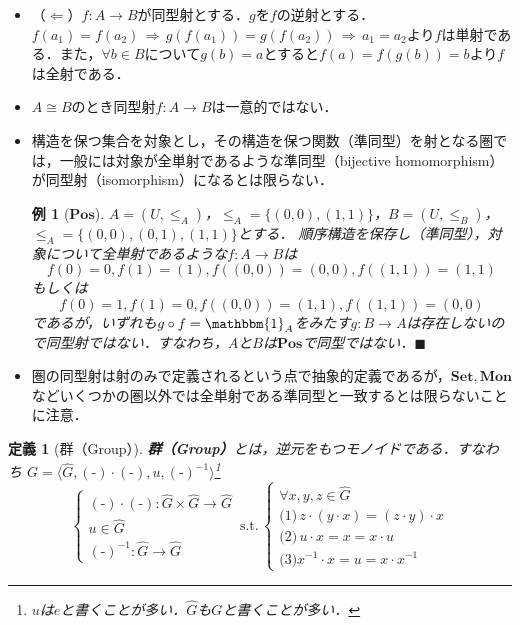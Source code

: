 \documentclass[dvipdfmx,a4j,10pt]{jsarticle}
\makeatletter
\theoremstyle{mystyle1}
\theoremstyle{mystyle2}
\newtheorem{dfn*}{定義}
\newtheorem{example}{例}
\renewenvironment{proof}[1][\proofname]{\par
  \pushQED{\qed}%
  \normalfont
  \topsep6\p@\@plus6\p@ \trivlist
  \item[\hskip\labelsep{\bfseries\sffamily #1}]\ignorespaces
}{%
  \popQED\endtrivlist\@endpefalse
}
\renewcommand\proofname{証明}
\newcommand{\Mon}{\mathbf{Mon}}
\makeatother
\begin{document}
\begin{itemize}
\begin{proof}
		      （$\Leftarrow$）$f:A\to B$が同型射とする．$g$を$f$の逆射とする．$f(a_1)=f(a_2)\,\Rightarrow\, g(f(a_1))=g(f(a_2))\,\Rightarrow\, a_1=a_2$より$f$は単射である．また，$\forall b\in B$について$g(b)=a$とすると$f(a)=f(g(b))=b$より$f$は全射である．
	      \end{proof}
	\item $A\cong B$のとき同型射$f:A\to B$は一意的ではない．
	\item 構造を保つ集合を対象とし，その構造を保つ関数（準同型）を射となる圏では，一般には対象が全単射であるような準同型（bijective homomorphism）が同型射（isomorphism）になるとは限らない．
	      \begin{example}[$\mathbf{Pos}$]
		      $A=(U,\leq_A)$，$\leq_A=\{(0,0),(1,1)\}$，$B=(U,\leq_B)$，$\leq_A=\{(0,0),(0,1),(1,1)\}$とする．
		      順序構造を保存し（準同型），対象について全単射であるような$f:A\to B$は
		      \[
			      f(0)=0,f(1)=(1),f((0,0))=(0,0),f((1,1))=(1,1)
		      \]
		      もしくは
		      \[
			      f(0)=1,f(1)=0,f((0,0))=(1,1),f((1,1))=(0,0)
		      \]
		      であるが，いずれも$g\circ f=\mathbbm{1}_A$をみたす$g:B\to A$は存在しないので同型射ではない．すなわち，$A$と$B$は$\mathbf{Pos}$で同型ではない．$\blacksquare$
	      \end{example}
	\item 圏の同型射は射のみで定義されるという点で抽象的定義であるが，$\mathbf{Set},\Mon$などいくつかの圏以外では全単射である準同型と一致するとは限らないことに注意．
\end{itemize}

\begin{dfn*}[群（Group）]
	\textbf{群（Group）}とは，逆元をもつモノイドである．すなわち
	$G=\langle \hat{G},(\textrm{-})\cdot (\textrm{-}),u,(\textrm{-})^{-1} \rangle$\footnote{$u$は$e$と書くことが多い．$\hat G$も$G$と書くことが多い．}\\
	\[
		\begin{cases}
			(\textrm{-})\cdot(\textrm{-}):\hat{G}\times\hat{G}\to\hat{G} \\
			u\in\hat{G}                                                  \\
			(\textrm{-})^{-1}:\hat{G}\to\hat{G}
		\end{cases}\,\textrm{s.t.}\,
		\begin{cases}
			\forall x,y,z\in\hat{G}                          \\
			\textrm{(1)}\,z\cdot(y\cdot x)=(z\cdot y)\cdot x \\
			\textrm{(2)}\, u\cdot x=x=x\cdot u               \\
			\textrm{(3)} x^{-1}\cdot x=u=x\cdot x^{-1}
		\end{cases}
	\]
\end{dfn*}
\end{document}
